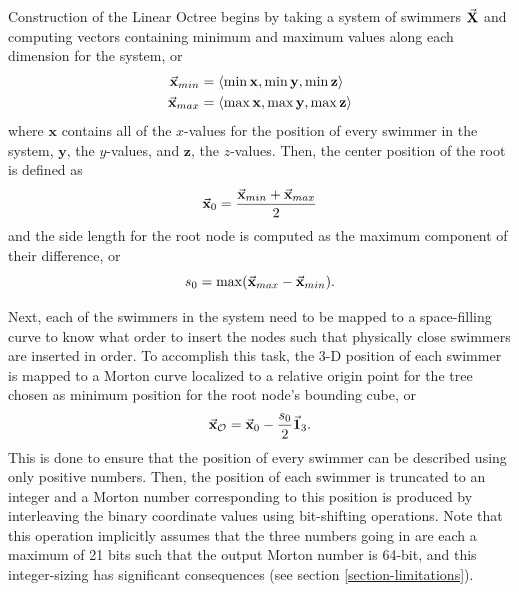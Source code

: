 \documentclass[letterpaper, 10pt, twoside]{LTJournalArticle}
\renewcommand{\O}{\mathcal{O}}
\begin{document}
Construction of the Linear Octree begins by taking a system of swimmers $\va{X}$
and computing vectors containing minimum and maximum values along each dimension
for the system, or
\begin{align}\label{eq-linear-octree-root-vals}
  \va{x}_{min} &= \langle \min \mathbf{x}, \min \mathbf{y},
  \min \mathbf{z} \rangle \\
  \va{x}_{max} &= \langle \max \mathbf{x}, \max \mathbf{y},
  \max \mathbf{z} \rangle
\end{align}
where $\mathbf{x}$ contains all of the $x$-values for the position of every
swimmer in the system, $\mathbf{y}$, the $y$-values, and $\mathbf{z}$, the
$z$-values. Then, the center position of the root is defined as
\begin{equation}\label{eq-linear-octree-root-center-pos}
  \va{x}_{0} = \frac{\va{x}_{min} + \va{x}_{max}}{2}
\end{equation}
and the side length for the root node is computed as the maximum component of
their difference, or
\begin{equation}\label{eq-linear-octree-root-side-len}
  s_0 = \max (\va{x}_{max} - \va{x}_{min}).
\end{equation}

Next, each of the swimmers in the system need to be mapped to a space-filling
curve to know what order to insert the nodes such that physically close
swimmers are inserted in order. To accomplish this task, the 3-D position of
each swimmer is mapped to a Morton curve localized to a relative origin point
for the tree chosen as minimum position for the root node's bounding cube, or
\begin{equation}\label{eq-linear-octree-rel-origin}
  \va{x}_{\O} = \va{x}_0 - \frac{s_0}{2} \va{1}_3.
\end{equation}
This is done to ensure that the position of every swimmer can be described using
only positive numbers. Then, the position of each swimmer is truncated to an
integer and a Morton number corresponding to this position is produced by
interleaving the binary coordinate values using bit-shifting operations. Note
that this operation implicitly assumes that the three numbers going in are each
a maximum of 21 bits such that the output Morton number is 64-bit, and this
integer-sizing has significant consequences (see section
\ref{section-limitations}).
\end{document}
